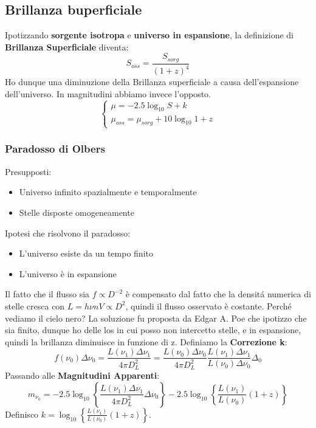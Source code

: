 \documentclass[12pt, a4paper]{article}
\begin{document}
\subsection{Brillanza buperficiale}
Ipotizzando \textbf{sorgente isotropa} e \textbf{universo in espansione}, la definizione di \textbf{Brillanza Superficiale} diventa:
\begin{equation}
    S_{oss}=\frac{S_{sorg}}{(1+z)^4}
\end{equation}
Ho dunque una diminuzione della Brillanza superficiale a  causa dell'espansione dell'universo. In magnitudini abbiamo invece l'opposto.
\begin{equation}
     \begin{cases}
        \mu=-2.5\log_{10}{S}+k
         \\
        \mu_{oss}=\mu_{sorg}+10\log_{10}{1+z}
     \end{cases}
\end{equation}
\subsubsection{Paradosso di Olbers}
Presupposti:
\begin{itemize}
    \item Universo infinito spazialmente e temporalmente
    \item Stelle disposte omogeneamente
\end{itemize}
Ipotesi che risolvono il paradosso:
\begin{itemize}
    \item L'universo esiste da un tempo finito
    \item L'universo è in espansione
\end{itemize}
Il fatto che il flusso sia $f \propto D^{-2}$ è compensato dal fatto che la densit\'{a} numerica di stelle cresca con $L= h \nu n V\propto D^2$, quindi il flusso osservato è costante. Perch\'{e} vediamo il cielo nero? La soluzione fu proposta da Edgar A. Poe che ipotizzo che sia finito, dunque ho delle los in cui posso non intercetto stelle, e in espansione, quindi la brillanza diminuisce in funzione di z.
Definiamo la \textbf{Correzione k}:
\begin{equation}
    f(\nu_0) \Delta\nu_0=\frac{L(\nu_1)\Delta\nu_1}{4\pi D_L^2}=\frac{L(\nu_0)\Delta\nu_0}{4\pi D_L^2}\frac{L(\nu_1)\Delta\nu_1}{L(\nu_0)\Delta\nu_0}\Delta_0
\end{equation}
Passando alle \textbf{Magnitudini Apparenti}:
\begin{equation}
    m_{\nu_0}=-2.5\log_{10}{\left\{\frac{L(\nu_1)\Delta\nu_1}{4\pi D_L^2}\Delta\nu_0\right\}}-2.5\log_{10}{\left\{\frac{L(\nu_1)}{L(\nu_0)}(1+z)\right\}}
\end{equation}
Definisco $k=\log_{10}{\left\{\frac{L(\nu_1)}{L(\nu_0)}(1+z)\right\}}$.
\end{document}
